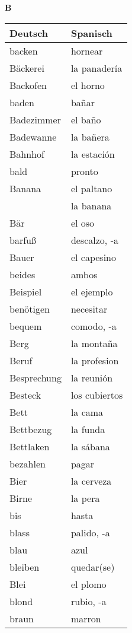 \begin{flushright}\begin{Huge}\textbf{B}\end{Huge}\end{flushright}

\begin{longtable}{p{} p{}} 
\textbf{Deutsch}     & \textbf{Spanisch}                                       \\ \hline
\hline
\endhead %
backen & hornear\\
Bäckerei & la panadería\\
Backofen & el horno\\
baden & bañar\\
Badezimmer & el baño\\
Badewanne & la bañera\\
Bahnhof & la estación \\
bald & pronto\\
Banana & el paltano\\
~ & la banana\\
Bär & el oso\\
barfuß & descalzo, -a\\
Bauer & el capesino \\
beides & ambos\\
Beispiel & el ejemplo \\
benötigen & necesitar\\
bequem & comodo, -a\\
Berg & la montaña \\
Beruf & la profesion\\
Besprechung & la reunión\\
Besteck & los cubiertos\\
Bett & la cama \\
Bettbezug & la funda\\
Bettlaken & la sábana\\
bezahlen & pagar\\
Bier & la cerveza\\
Birne & la pera\\
bis & hasta \\
blass & palido, -a\\
blau & azul \\
bleiben & quedar(se)\\
Blei & el plomo \\
blond & rubio, -a\\
braun & marron \\

\end{longtable}
